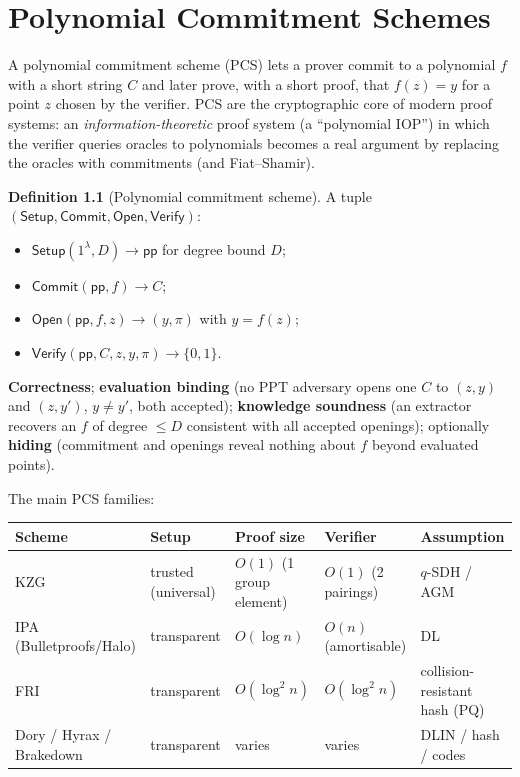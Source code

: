 \documentclass[11pt,a4paper]{report}
\theoremstyle{plain}
\theoremstyle{definition}
\newtheorem{definition}[theorem]{Definition}
\theoremstyle{remark}
\newcommand{\Setup}{\mathsf{Setup}}\newcommand{\Com}{\mathsf{Com}}
\begin{document}
\chapter{Polynomial Commitment Schemes}
\label{ch:pcs}
A polynomial commitment scheme (PCS) lets a prover commit to a polynomial $f$ with a short string $C$ and later prove, with a short proof, that $f(z)=y$ for a point $z$ chosen by the verifier. PCS are the cryptographic core of modern proof systems: an \emph{information-theoretic} proof system (a ``polynomial IOP'') in which the verifier queries oracles to polynomials becomes a real argument by replacing the oracles with commitments (and Fiat--Shamir).
\begin{definition}[Polynomial commitment scheme]
A tuple $(\Setup,\mathsf{Commit},\mathsf{Open},\mathsf{Verify})$:
\begin{itemize}
\item $\Setup(1^\lambda,D)\to\mathsf{pp}$ for degree bound $D$;
\item $\mathsf{Commit}(\mathsf{pp},f)\to C$;
\item $\mathsf{Open}(\mathsf{pp},f,z)\to(y,\pi)$ with $y=f(z)$;
\item $\mathsf{Verify}(\mathsf{pp},C,z,y,\pi)\to\{0,1\}$.
\end{itemize}
\textbf{Correctness}; \textbf{evaluation binding} (no PPT adversary opens one $C$ to $(z,y)$ and $(z,y')$, $y\ne y'$, both accepted); \textbf{knowledge soundness} (an extractor recovers an $f$ of degree $\le D$ consistent with all accepted openings); optionally \textbf{hiding} (commitment and openings reveal nothing about $f$ beyond evaluated points).
\end{definition}
The main PCS families:
\begin{center}\small
\begin{tabular}{@{}L{2.8cm}L{2.4cm}L{3.0cm}L{2.7cm}L{2.4cm}@{}}\toprule
Scheme & Setup & Proof size & Verifier & Assumption\\\midrule
KZG & trusted (universal) & $O(1)$ (1 group element) & $O(1)$ (2 pairings) & $q$-SDH / AGM\\
IPA (Bulletproofs/Halo) & transparent & $O(\log n)$ & $O(n)$ (amortisable) & DL\\
FRI & transparent & $O(\log^2n)$ & $O(\log^2n)$ & collision-resistant hash (PQ)\\
Dory / Hyrax / Brakedown & transparent & varies & varies & DLIN / hash / codes\\\bottomrule
\end{tabular}
\end{center}
\end{document}
